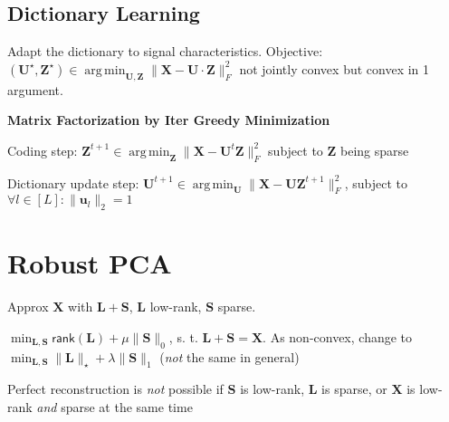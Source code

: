 \documentclass[a4paper, 11pt, landscape]{article}
\newenvironment{inlinelist}%
{\begin{enumerate*}[label=\textbf{\color{red}\theenumi.}]}%
{\end{enumerate*}}
\DeclareMathOperator*{\argmin}{arg\,min}
\begin{document}
\begin{multicols*}{3}
\subsection{Dictionary Learning}
Adapt the dictionary to signal characteristics. Objective: $(\mathbf{U}^\star, \mathbf{Z}^\star) \in \argmin_\mathbf{U,Z} \| \mathbf{X} - \mathbf{U} \cdot \mathbf{Z} \|_F^2$ not jointly convex but convex in 1 argument.

\textbf{Matrix Factorization by Iter Greedy Minimization}
\begin{inlinelist}
  \item Coding step: $\mathbf{Z}^{t+1} \in \argmin_\mathbf{Z} \| \mathbf{X} - \mathbf{U}^t \mathbf{Z} \|_F^2$ subject to $\mathbf{Z}$ being sparse
  \item Dictionary update step: $\mathbf{U}^{t+1} \in \argmin_\mathbf{U} \| \mathbf{X} - \mathbf{UZ}^{t+1} \|_F^2$, subject to $\forall l\in [L]:\|\mathbf{u}_l\|_2 = 1$
\end{inlinelist}

\section{Robust PCA}
\begin{compactitem}
	\item Approx $\mathbf{X}$ with $\mathbf{L} + \mathbf{S}$, $\mathbf{L}$ low-rank, $\mathbf{S}$ sparse.
	\item $\min_{\mathbf{L},\mathbf{S}}\mathsf{rank}(\mathbf{L}) + \mu \lVert \mathbf{S}\rVert_0$, s. t. $\mathbf{L} + \mathbf{S} = \mathbf{X}$. As non-convex, change to $\min_{\mathbf{L},\mathbf{S}} \|\mathbf{L}\|_\star + \lambda \lVert\mathbf{S}\rVert_1$ (\emph{not} the same in general)
	\item Perfect reconstruction is \emph{not} possible if $\mathbf{S}$ is low-rank, $\mathbf{L}$ is sparse, or $\mathbf{X}$ is low-rank \textit{and} sparse at the same time
\end{compactitem}


\end{multicols*}
\end{document}
